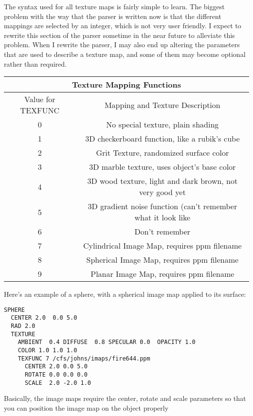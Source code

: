   The syntax used for all texture maps is fairly simple to learn.  The biggest
problem with the way that the parser is written now is that the different
mappings are selected by an integer, which is not very user friendly.  I 
expect to rewrite this section of the parser sometime in the near future to
alleviate this problem.  When I rewrite the parser, I may also end up altering
the parameters that are used to describe a texture map, and some of them may
become optional rather than required.  

\begin{center}
\begin{tabular}{|c|c|}
\multicolumn{2}{c}{Texture Mapping Functions} \\
\hline
{Value for TEXFUNC} & {Mapping and Texture Description}\\
\hline
{0} & {No special texture, plain shading}  \\
{1} & {3D checkerboard function, like a rubik's cube}  \\
{2} & {Grit Texture, randomized surface color}  \\
{3} & {3D marble texture, uses object's base color}  \\
{4} & {3D wood texture, light and dark brown, not very good yet}  \\
{5} & {3D gradient noise function (can't remember what it look like}  \\
{6} & {Don't remember}  \\
{7} & {Cylindrical Image Map, requires ppm filename}  \\
{8} & {Spherical Image Map, requires ppm filename}  \\
{9} & {Planar Image Map, requires ppm filename}  \\
\hline
\end{tabular}
\end{center}

Here's an example of a sphere, with a spherical image map applied to its
surface:
\begin{verbatim}
SPHERE
  CENTER 2.0  0.0 5.0   
  RAD 2.0 
  TEXTURE 
    AMBIENT  0.4 DIFFUSE  0.8 SPECULAR 0.0  OPACITY 1.0 
    COLOR 1.0 1.0 1.0  
    TEXFUNC 7 /cfs/johns/imaps/fire644.ppm  
      CENTER 2.0 0.0 5.0
      ROTATE 0.0 0.0 0.0 
      SCALE  2.0 -2.0 1.0
\end{verbatim}

Basically, the image maps require the center, rotate and scale parameters so
that you can position the image map on the object properly

